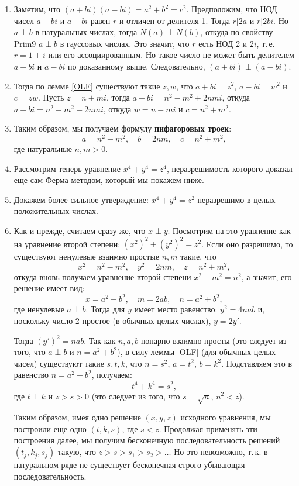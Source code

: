 \begin{enumerate}
\item Заметим, что $(a+bi)(a-bi)=a^2+b^2=c^2$. Предположим, что НОД чисел $a+bi$ и $a-bi$ равен $r$ и отличен от делителя 1. Тогда $r|2a$ и $r|2bi$. Но $a\perp b$ в натуральных числах, тогда $N(a)\perp N(b)$, откуда по свойству Prim9 $a\perp b$ в гауссовых числах. Это значит, что $r$ есть НОД 2 и $2i$, т.\,е. $r=1+i$ или его ассоциированным. Но такое число не может быть делителем $a+bi$ и $a-bi$ по доказанному выше. Следовательно, $(a+bi)\perp (a-bi)$.

\item Тогда по лемме \ref{OLF} существуют такие $z,w$, что $a+bi=z^2$, $a-bi=w^2$ и $c=zw$. Пусть $z=n+mi$, тогда $a+bi=n^2-m^2+2nmi$, откуда $a-bi=n^2-m^2-2nmi$, откуда $w=n-mi$ и $c=n^2+m^2$.

\item Таким образом, мы получаем формулу \textbf{пифагоровых троек}:
$$
a=n^2-m^2,\quad b=2nm,\quad c=n^2+m^2,
$$
где натуральные $n,m>0$.

\item Рассмотрим теперь уравнение $x^4+y^4=z^4$, неразрешимость которого доказал еще сам Ферма методом, который мы покажем ниже. 

\item Докажем более сильное утверждение: $x^4+y^4=z^2$ неразрешимо в целых положительных числах.
\item Как и прежде, считаем сразу же, что $x\perp y$. Посмотрим на это уравнение как на уравнение второй степени: $(x^2)^2+(y^2)^2=z^2$. Если оно разрешимо, то существуют ненулевые взаимно простые $n,m$ такие, что
$$
x^2=n^2-m^2,\quad y^2=2nm,\quad z=n^2+m^2,
$$
откуда вновь получаем уравнение второй степени $x^2+m^2=n^2$, а значит, его решение имеет вид:
$$
x=a^2+b^2,\quad m=2ab,\quad n=a^2+b^2,
$$
где ненулевые $a\perp b$. Тогда для $y$ имеет место равенство: $y^2=4nab$ и, поскольку число 2 простое (в обычных целых числах), $y=2y'$.

Тогда $(y')^2=nab$. Так как $n,a,b$ попарно взаимно просты (это следует из того, что $a\perp b$ и $n=a^2+b^2$), в силу леммы \ref{OLF} (для обычных целых чисел) существуют такие $s,t,k$, что $n=s^2$, $a=t^2$, $b=k^2$. Подставляем это в равенство $n=a^2+b^2$, получаем:
$$
t^4+k^4=s^2,
$$
где $t\perp k$ и $z>s>0$ (это следует из того, что $s=\sqrt n$, $n^2<z$). 

Таким образом, имея одно решение $(x,y,z)$ исходного уравнения, мы построили еще одно $(t,k,s)$, где $s<z$. Продолжая применять эти построения далее, мы получим бесконечную последовательность решений $(t_j,k_j,s_j)$ такую, что $z>s>s_1>s_2>\dots$ Но это невозможно, т.\,к. в натуральном ряде не существует бесконечная строго убывающая последовательность.


\end{enumerate}
